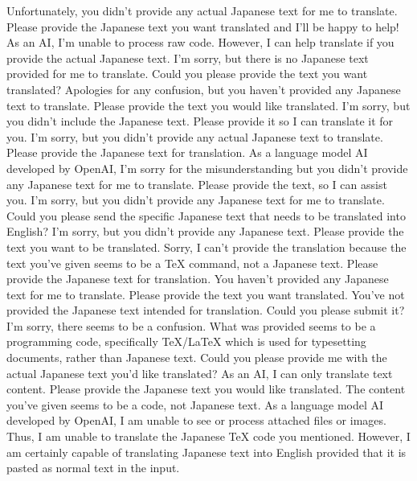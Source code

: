 {%
Unfortunately, you didn't provide any actual Japanese text for me to translate. Please provide the Japanese text you want translated and I'll be happy to help!
As an AI, I'm unable to process raw code. However, I can help translate if you provide the actual Japanese text.
I'm sorry, but there is no Japanese text provided for me to translate. Could you please provide the text you want translated?
Apologies for any confusion, but you haven't provided any Japanese text to translate. Please provide the text you would like translated.
I'm sorry, but you didn't include the Japanese text. Please provide it so I can translate it for you.
I'm sorry, but you didn't provide any actual Japanese text to translate. Please provide the Japanese text for translation.
As a language model AI developed by OpenAI, I'm sorry for the misunderstanding but you didn't provide any Japanese text for me to translate. Please provide the text, so I can assist you.
I'm sorry, but you didn't provide any Japanese text for me to translate. Could you please send the specific Japanese text that needs to be translated into English?
I'm sorry, but you didn't provide any Japanese text. Please provide the text you want to be translated.
Sorry, I can't provide the translation because the text you've given seems to be a TeX command, not a Japanese text. Please provide the Japanese text for translation.
You haven't provided any Japanese text for me to translate. Please provide the text you want translated.
You've not provided the Japanese text intended for translation. Could you please submit it?
I'm sorry, there seems to be a confusion. What was provided seems to be a programming code, specifically TeX/LaTeX which is used for typesetting documents, rather than Japanese text. Could you please provide me with the actual Japanese text you'd like translated?
As an AI, I can only translate text content. Please provide the Japanese text you would like translated. The content you've given seems to be a code, not Japanese text.
As a language model AI developed by OpenAI, I am unable to see or process attached files or images. Thus, I am unable to translate the Japanese TeX code you mentioned. However, I am certainly capable of translating Japanese text into English provided that it is pasted as normal text in the input.
}
